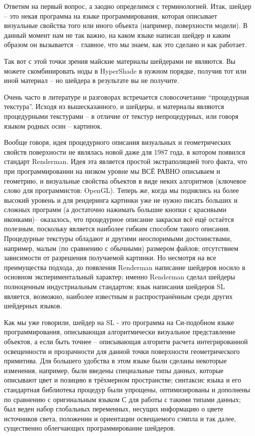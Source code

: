  Ответим на первый вопрос, а заодно определимся с
    терминологией. Итак, шейдер – это некая программа на языке
    программирования, которая описывает визуальные свойства того или
    иного объекта (например, поверхности модели). В данный момент нам
    не так важно, на каком языке написан шейдер и каким образом он
    вызывается – главное, что мы знаем, как это сделано и как
    работает.
  

 Так вот с этой точки зрения майские материалы
    шейдерами не являются. Вы можете скомбинировать ноды в HyperShade в нужном порядке, получив тот или иной материал –
    но шейдера в результате вы не получите.
  

 Очень часто в литературе и разговорах встречается
    словосочетание “процедурная текстура”. Исходя из вышесказанного, и
    шейдеры, и материалы являются процедурными текстурами – в отличие
    от текстур непроцедурных, или говоря языком родных осин –
    картинок.
  

 Вообще говоря, идея процедурного описания
    визуальных и геометрических свойств  поверхности не являлась новой
    даже для 1987 года, в котором появился стандарт Renderman. Идея
    эта является простой экстраполяцией того факта, что при
    программировании на низком уровне мы ВСЁ РАВНО описываем и
    геометрию, и визуальные свойства объектов в виде неких алгоритмов
    (ключевое слово для программистов: OpenGL). Теперь
    же, когда мы поднялись на более высокий уровень и для рендеринга
    картинки уже не нужно писать больших и сложных программ (а
    достаточно нажимать большие кнопки с красивыми иконками)–
    оказалось, что процедурное описание закраски всё ещё остаётся
    полезным, поскольку является наиболее гибким способом такого
    описания. Процедурные текстуры обладают и другими неоспоримыми
    достоинствами, например, малым (по сравнению с обычными) размером
    файлов; отсутствием зависимости от разрешения получаемой картинки.
    Но несмотря на все преимущества подхода, до появления Renderman написание шейдеров носило в основном экспериментальный
    характер; именно Renderman сделал
    шейдеры полноценным индустриальным стандартом; язык написания
    шейдеров SL является, возможно, наиболее известным и
    распространённым среди других шейдерных языков.
  

 Как мы уже говорили, шейдер на SL - это программа
    на Си-подобном языке программирования, описывающая алгоритмически
    визуальное представление объектов, а если быть точнее – описывающая
    алгоритм расчета интегрированной освещенности и прозрачности для
    данной точки поверхности геометрического примитива. Для большего
    удобства в этом языке были сделаны некоторые изменения, например,
    были введены специальные типы данных, которые описывают цвет и
    позицию в трёхмерном пространстве; синтаксис языка и его
    стандартная библиотека процедур были упрощены, оптимизированы и
    дополнены по сравнению с оригинальным языком С для работы с такими
    типами данных; был веден набор глобальных переменных, несущих
    информацию о цвете источников света, положении и ориентации
    освещаемого сэмпла и так далее, существенно облегчающих
    программирование шейдеров.
  

